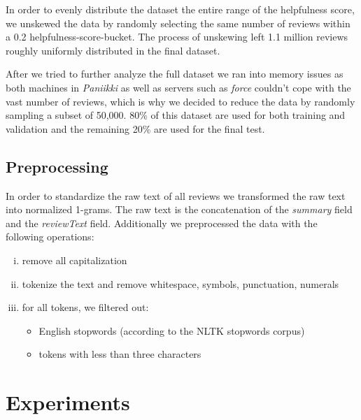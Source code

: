 \documentclass[a4paper,11pt]{article}
\begin{document}
In order to evenly distribute the dataset the entire range of the helpfulness score, we unskewed the data by randomly selecting the same number of reviews within a 0.2 helpfulness-score-bucket. The process of unskewing left 1.1 million reviews roughly uniformly distributed in the final dataset.

After we tried to further analyze the full dataset we ran into memory issues as both machines in \textit{Paniikki} as well as servers such as \textit{force} couldn't cope with the vast number of reviews, which is why we decided to reduce the data by randomly sampling a subset of 50,000. 80\% of this dataset are used for both training and validation and the remaining 20\% are used for the final test.

\subsection{Preprocessing}

In order to standardize the raw text of all reviews we transformed the raw text into normalized 1-grams. The raw text is the concatenation of the \textit{summary} field and the \textit{reviewText} field. 
Additionally we preprocessed the data with the following operations:

\begin{enumerate}[(i)]
\item remove all capitalization
\item tokenize the text and remove whitespace, symbols, punctuation, numerals
\item for all tokens, we filtered out:
\begin{itemize}
\item English stopwords (according to the NLTK stopwords corpus)
\item tokens with less than three characters
\end{itemize}
\end{enumerate}


\section{Experiments}

\end{document}
